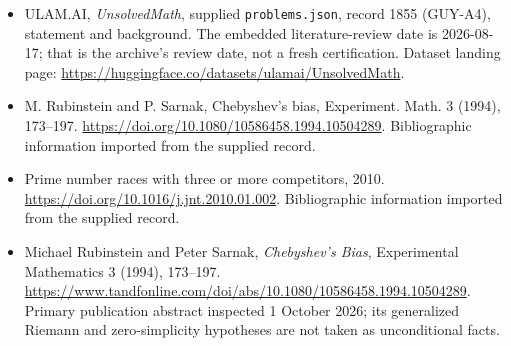 \documentclass[11pt,a4paper]{article}
\begin{document}
{\small

\begin{itemize}

\item[\hypertarget{source:1855:1}{S1}] ULAM.AI, \emph{UnsolvedMath}, supplied \texttt{problems.json}, record 1855 (GUY-A4), statement and background. The embedded literature-review date is 2026-08-17; that is the archive’s review date, not a fresh certification. Dataset landing page: \url{https://huggingface.co/datasets/ulamai/UnsolvedMath}.

\item[\hypertarget{source:1855:2}{S2}] M. Rubinstein and P. Sarnak, Chebyshev's bias, Experiment. Math. 3 (1994), 173--197. \url{https://doi.org/10.1080/10586458.1994.10504289}. Bibliographic information imported from the supplied record.

\item[\hypertarget{source:1855:3}{S3}] Prime number races with three or more competitors, 2010. \url{https://doi.org/10.1016/j.jnt.2010.01.002}. Bibliographic information imported from the supplied record.


\item[E1] Michael Rubinstein and Peter Sarnak, \emph{Chebyshev's Bias},
Experimental Mathematics 3 (1994), 173--197.
\url{https://www.tandfonline.com/doi/abs/10.1080/10586458.1994.10504289}.
Primary publication abstract inspected 1 October 2026; its generalized
Riemann and zero-simplicity hypotheses are not taken as unconditional facts.

\end{itemize}

}

\label{end:1855}
\end{document}

